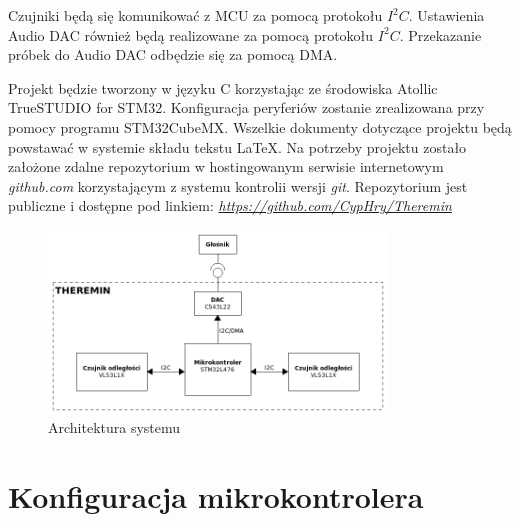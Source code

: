 \documentclass[10pt, a4paper]{article}
\begin{document}
Czujniki będą się komunikować z MCU za pomocą protokołu $I^2C$. Ustawienia Audio DAC również będą realizowane za pomocą protokołu $I^2C$. Przekazanie próbek do Audio DAC odbędzie się za pomocą DMA.


Projekt będzie tworzony w języku C korzystając ze środowiska Atollic TrueSTUDIO for STM32. Konfiguracja peryferiów zostanie zrealizowana przy pomocy programu STM32CubeMX. Wszelkie dokumenty dotyczące projektu będą powstawać w systemie składu tekstu \LaTeX. Na potrzeby projektu zostało założone zdalne repozytorium w hostingowanym serwisie internetowym \textit{github.com} korzystającym z systemu kontrolii wersji \textit{git}. Repozytorium jest publiczne i dostępne pod linkiem: \href{https://github.com/CypHry/Theremin}{\textit{https://github.com/CypHry/Theremin}}
\begin{figure}[H]
	\centering
	\includegraphics[width=0.8\textwidth]{architektura.png}
	\caption{Architektura systemu}
	\label{fig:Architektura}
\end{figure}



 
\section{Konfiguracja mikrokontrolera}
\end{document}
